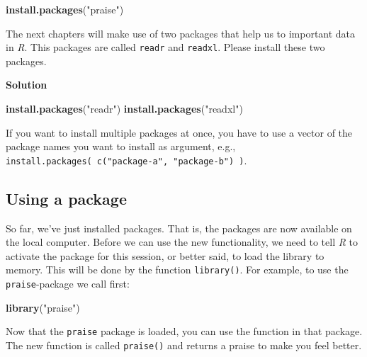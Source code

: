 \documentclass[
]{scrartcl}
\makeatletter
\newenvironment{Shaded}{\begin{snugshade}}{\end{snugshade}}
\newcommand{\FunctionTok}[1]{\textcolor[rgb]{0.13,0.29,0.53}{\textbf{#1}}}
\newcommand{\NormalTok}[1]{#1}
\newcommand{\StringTok}[1]{\textcolor[rgb]{0.31,0.60,0.02}{#1}}
\newenvironment{kframe}{%
\medskip{}
\setlength{\fboxsep}{.8em}
 \def\at@end@of@kframe{}%
 \ifinner\ifhmode%
  \def\at@end@of@kframe{\end{minipage}}%
  \begin{minipage}{\columnwidth}%
 \fi\fi%
 \def\FrameCommand##1{\hskip\@totalleftmargin \hskip-\fboxsep
 \colorbox{shadecolor}{##1}\hskip-\fboxsep
     \hskip-\linewidth \hskip-\@totalleftmargin \hskip\columnwidth}%
 \MakeFramed {\advance\hsize-\width
   \@totalleftmargin\z@ \linewidth\hsize
   \@setminipage}}%
 {\par\unskip\endMakeFramed%
 \at@end@of@kframe}
\newenvironment{rmdblock}[1]
  {
  \begin{itemize}
  \renewcommand{\labelitemi}{
    \raisebox{-.7\height}[0pt][0pt]{
      {\setkeys{Gin}{width=3em,keepaspectratio}\texttt{[image: images/\#1]}}
    }
  }
  \setlength{\fboxsep}{1em}
  \begin{kframe}
  \item
  }
  {
  \end{kframe}
  \end{itemize}
  }
\newenvironment{geek}
    {\begin{rmdblock}{geek}}
    {\end{rmdblock}}
\newenvironment{myexercise}
    {\begin{rmdblock}{exercise_green}}
    {\end{rmdblock}}
\newenvironment{webexsolution}[1]
    {\par\tiny\textbf{#1}}
    {\par}
\newcommand{\webexhide}[1]{\begin{webexsolution}{#1}}
\newcommand{\webexunhide}{\end{webexsolution}}
\makeatother
\begin{document}
\begin{Shaded}
\begin{Highlighting}[]
\FunctionTok{install.packages}\NormalTok{(}\StringTok{"praise"}\NormalTok{)}
\end{Highlighting}
\end{Shaded}

\begin{myexercise}
The next chapters will make use of two packages that help us to
important data in \emph{R}. This packages are called \texttt{readr} and
\texttt{readxl}. Please install these two packages.
\end{myexercise}
\webexhide{Solution}

\begin{Shaded}
\begin{Highlighting}[]
\FunctionTok{install.packages}\NormalTok{(}\StringTok{"readr"}\NormalTok{)}
\FunctionTok{install.packages}\NormalTok{(}\StringTok{"readxl"}\NormalTok{)}
\end{Highlighting}
\end{Shaded}

\webexunhide

\begin{geek}
If you want to install multiple packages at once, you have to use a
vector of the package names you want to install as argument, e.g.,
\texttt{install.packages(\ c("package-a",\ "package-b")\ )}.
\end{geek}

\hypertarget{using-a-package}{%
\subsection{Using a package}\label{using-a-package}}

So far, we've just installed packages. That is, the packages are now available on the local computer. Before we can use the new functionality, we need to tell \emph{R} to activate the package for this session, or better said, to load the library to memory. This will be done by the function \texttt{library()}. For example, to use the \texttt{praise}-package we call first:

\begin{Shaded}
\begin{Highlighting}[]
\FunctionTok{library}\NormalTok{(}\StringTok{"praise"}\NormalTok{)}
\end{Highlighting}
\end{Shaded}

Now that the \texttt{praise} package is loaded, you can use the function in that package. The new function is called \texttt{praise()} and returns a praise to make you feel better.
\end{document}
